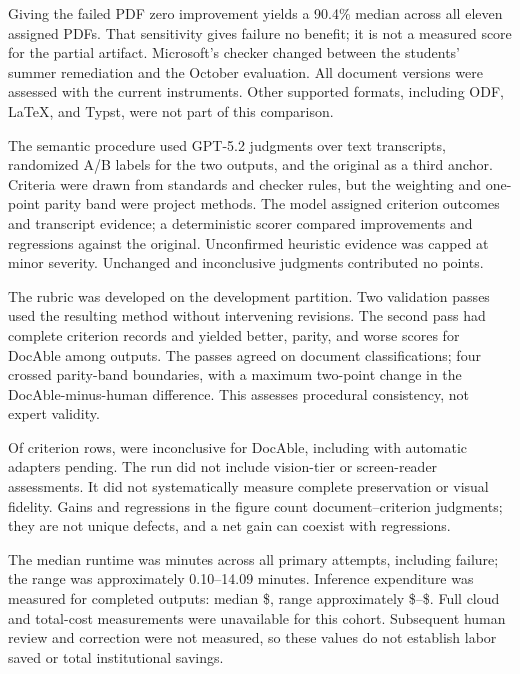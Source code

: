 Giving the failed PDF zero improvement yields a 90.4\% median across all eleven assigned PDFs. That sensitivity gives failure no benefit; it is not a measured score for the partial artifact. Microsoft's checker changed between the students' summer remediation and the October evaluation. All document versions were assessed with the current instruments. Other supported formats, including ODF, LaTeX, and Typst, were not part of this comparison.

The semantic procedure used GPT-5.2 judgments over text transcripts, randomized A/B labels for the two outputs, and the original as a third anchor. Criteria were drawn from standards and checker rules, but the weighting and one-point parity band were project methods. The model assigned criterion outcomes and transcript evidence; a deterministic scorer compared improvements and regressions against the original. Unconfirmed heuristic evidence was capped at minor severity. Unchanged and inconclusive judgments contributed no points.

The rubric was developed on the development partition. Two validation passes used the resulting method without intervening revisions. The second pass had complete criterion records and yielded  better,  parity, and  worse scores for DocAble among  outputs. The passes agreed on  document classifications; four crossed parity-band boundaries, with a maximum two-point change in the DocAble-minus-human difference. This assesses procedural consistency, not expert validity.

Of  criterion rows,  were inconclusive for DocAble, including  with automatic adapters pending. The run did not include vision-tier or screen-reader assessments. It did not systematically measure complete preservation or visual fidelity. Gains and regressions in the figure count document--criterion judgments; they are not unique defects, and a net gain can coexist with regressions.

The median runtime was  minutes across all  primary attempts, including failure; the range was approximately 0.10--14.09 minutes. Inference expenditure was measured for  completed outputs: median \$, range approximately \$--\$. Full cloud and total-cost measurements were unavailable for this cohort. Subsequent human review and correction were not measured, so these values do not establish labor saved or total institutional savings.

